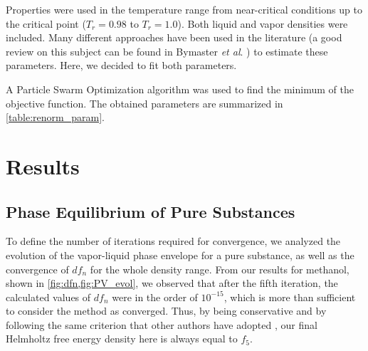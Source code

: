 \documentclass[preprint,12pt,3p]{elsarticle}
\begin{document}
Properties were used in the temperature range from near-critical conditions up to the critical point ($T_r=0.98$ to $T_r=1.0$).
Both liquid and vapor densities were included.
Many different approaches have been used in the literature (a good review on this subject can be found in Bymaster \textit{et al}. \cite{bymaster2008renormalization}) to estimate these parameters.
Here, we decided to fit both parameters.

A Particle Swarm Optimization algorithm \cite{kennedy1995particle} was used to find the minimum of the objective function.
The obtained parameters are summarized in \cref{table:renorm_param}.

\begin{table}[ht!]
	\centering
	\caption{Renormalization method parameters estimated using the procedure described in \cref{sec:Parameter Estimation}.}
	\label{table:renorm_param}
\end{table}

\section{Results}

\subsection{Phase Equilibrium of Pure Substances}
\label{sec:pure-substance phase equilibrium results}

To define the number of iterations required for convergence, we analyzed the evolution of the vapor-liquid phase envelope for a pure substance, as well as the convergence of $df_{n}$ for the whole density range.
From our results for methanol, shown in \cref{fig:dfn,fig:PV_evol}, we observed that after the fifth iteration, the calculated values of $df_{n}$ were in the order of $10^{-15}$, which is more than sufficient to consider the method as converged.
Thus, by being conservative and by following the same criterion that other authors have adopted \cite{llovell2004thermodynamic, cai2004thermodynamics, pcm2017application}, our final Helmholtz free energy density here is always equal to $f_{5}$.
\end{document}
